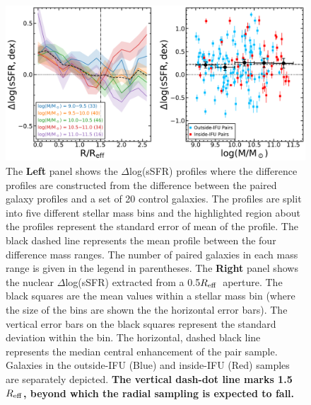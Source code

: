 \documentclass[apj,twocolumn]{emulateapj}
\newcommand{\reff}{$R_{\rm eff}$}
\begin{document}
\begin{CJK*}{UTF8}{gbsn}
\begin{figure}
\centering
\includegraphics[width=0.8\linewidth]{ssfr_mass.pdf}
\caption[]{The \textbf{Left} panel shows the $\Delta$log(sSFR) profiles where the difference profiles are constructed from the difference between the paired galaxy profiles and a set of 20 control galaxies. The profiles are split into five different stellar mass bins and the highlighted region about the profiles represent the standard error of mean of the profile. The black dashed line represents the mean profile between the four difference mass ranges. The number of paired galaxies in each mass range is given in the legend in parentheses. The \textbf{Right} panel shows the nuclear $\Delta$log(sSFR) extracted from a 0.5\reff\ aperture. The black squares are the mean values within a stellar mass bin (where the size of the bins are shown the the horizontal error bars). The vertical error bars on the black squares represent the standard deviation within the bin. The horizontal, dashed black line represents the median central enhancement of the pair sample. Galaxies in the outside-IFU (Blue) and inside-IFU (Red) samples are separately depicted. {\bf The vertical dash-dot line marks 1.5 \reff, beyond which the radial sampling is expected to fall. }
}
\label{fig:ssfr_mass}
\end{figure}


\end{CJK*}
\end{document}
